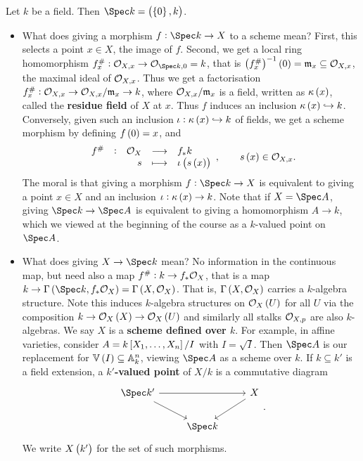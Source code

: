 \begin{example*}
Let $ k $ be a field. Then $ \Spec k = \br{\cbr{0}, k} $.
\begin{itemize}
\item What does giving a morphism $ f : \Spec k \to X $ to a scheme mean? First, this selects a point $ x \in X $, the image of $ f $. Second, we get a local ring homomorphism $ f_x^\# : \OOO_{X, x} \to \OOO_{\Spec k, 0} = k $, that is $ \br{f_x^\#}^{-1}\br{0} = \mmm_x \subseteq \OOO_{X, x} $, the maximal ideal of $ \mathcal{O}_{X, x} $. Thus we get a factorisation $ f_x^\# : \mathcal{O}_{X, x} \to \mathcal{O}_{X, x} / \mathfrak{m}_x \to k $, where $ \mathcal{O}_{X, x} / \mathfrak{m}_x $ is a field, written as $ \kappa\br{x} $, called the \textbf{residue field} of $ X $ at $ x $. Thus $ f $ induces an inclusion $ \kappa\br{x} \hookrightarrow k $. Conversely, given such an inclusion $ \iota : \kappa\br{x} \hookrightarrow k $ of fields, we get a scheme morphism by defining $ f\br{0} = x $, and
$$ \function[f^\#]{\OOO_X}{f_*k}{s}{\iota\br{s\br{x}}}, \qquad s\br{x} \in \OOO_{X, x}. $$
The moral is that giving a morphism $ f : \Spec k \to X $ is equivalent to giving a point $ x \in X $ and an inclusion $ \iota : \kappa\br{x} \to k $. Note that if $ X = \Spec A $, giving $ \Spec k \to \Spec A $ is equivalent to giving a homomorphism $ A \to k $, which we viewed at the beginning of the course as a $ k $-valued point on $ \Spec A $.


\item What does giving $ X \to \Spec k $ mean? No information in the continuous map, but need also a map $ f^\# : k \to f_*\mathcal{O}_X $, that is a map $ k \to \Gamma\br{\Spec k, f_*\OOO_X} = \Gamma\br{X, \OOO_X} $. That is, $ \Gamma\br{X, \OOO_X} $ carries a $ k $-algebra structure. Note this induces $ k $-algebra structures on $ \OOO_X\br{U} $ for all $ U $ via the composition $ k \to \OOO_X\br{X} \to \OOO_X\br{U} $ and similarly all stalks $ \mathcal{O}_{X, p} $ are also $ k $-algebras. We say $ X $ is a \textbf{scheme defined over $ k $}. For example, in affine varieties, consider $ A = k\sbr{X_1, \dots, X_n} / I $ with $ I = \sqrt{I} $. Then $ \Spec A $ is our replacement for $ \VV\br{I} \subseteq \AA_k^n $, viewing $ \Spec A $ as a scheme over $ k $. If $ k \subseteq k' $ is a field extension, a \textbf{$ k' $-valued point} of $ X / k $ is a commutative diagram
$$
\begin{tikzcd}
\Spec k' \arrow{rr} \arrow{dr} & & X \arrow{dl} \\
& \Spec k &
\end{tikzcd}.
$$
We write $ X\br{k'} $ for the set of such morphisms.
\end{itemize}
\end{example*}

